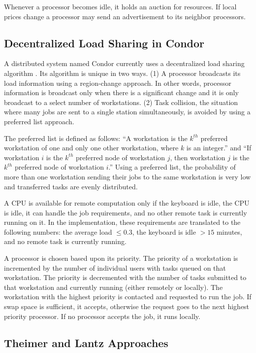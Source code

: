 \documentclass{report}
\begin{document}
Whenever a processor becomes idle, it holds an auction for resources.  If
local prices change a processor may send an advertisement to its neighbor
processors.


\subsection{Decentralized Load Sharing in Condor \cite{condor}}

A distributed system named Condor currently uses a decentralized load
sharing algorithm \cite{condor_load}.  Its algorithm is unique in two ways.
(1) A processor broadcasts its load information using a region-change
approach.  In other words, processor information is broadcast only when
there is a significant change and it is only broadcast to a select number of
workstations.  (2) Task collision, the situation where many jobs are sent to
a single station simultaneously, is avoided by using a preferred list
approach.

The preferred list is defined as follows: ``A workstation is the $k^{th}$
preferred workstation of one and only one other workstation, where $k$ is an
integer.''  and ``If workstation $i$ is the $k^{th}$ preferred node of
workstation $j$, then workstation $j$ is the $k^{th}$ preferred node of
workstation $i$.''  Using a preferred list, the probability of more than one
workstation sending their jobs to the same workstation is very low and
transferred tasks are evenly distributed.

A CPU is available for remote computation only if the keyboard is idle, the
CPU is idle, it can handle the job requirements, and no other remote task is
currently running on it.  In the implementation, these requirements are
translated to the following numbers: the average load $\leq 0.3$, the
keyboard is idle $> 15$ minutes, and no remote task is currently running.

A processor is chosen based upon its priority.  The priority of a
workstation is incremented by the number of individual users with tasks
queued on that workstation.  The priority is decremented with the number of
tasks submitted to that workstation and currently running (either remotely
or locally).  The workstation with the highest priority is contacted and
requested to run the job.  If swap space is sufficient, it accepts,
otherwise the request goes to the next highest priority processor.  If no
processor accepts the job, it runs locally.


\subsection{Theimer and Lantz Approaches \cite{idle_workstations}}
\end{document}
